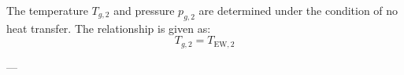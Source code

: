 The temperature \( T_{g,2} \) and pressure \( p_{g,2} \) are determined under the condition of no heat transfer.  
The relationship is given as:  
\[
T_{g,2} = T_{\text{EW},2}
\]

---